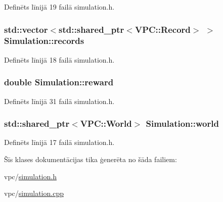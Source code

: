Definēts līnijā 19 failā simulation.\+h.

\subsubsection[{\texorpdfstring{records}{records}}]{\setlength{\rightskip}{0pt plus 5cm}std\+::vector$<$std\+::shared\+\_\+ptr$<${\bf V\+P\+C\+::\+Record}$>$ $>$ Simulation\+::records}\hypertarget{class_simulation_a8e55698283d8bbba9843391b0d9ecfa8}{}\label{class_simulation_a8e55698283d8bbba9843391b0d9ecfa8}


Definēts līnijā 18 failā simulation.\+h.

\subsubsection[{\texorpdfstring{reward}{reward}}]{\setlength{\rightskip}{0pt plus 5cm}double Simulation\+::reward}\hypertarget{class_simulation_a5224aea8e98ffc054c58674ab1494971}{}\label{class_simulation_a5224aea8e98ffc054c58674ab1494971}


Definēts līnijā 31 failā simulation.\+h.

\subsubsection[{\texorpdfstring{world}{world}}]{\setlength{\rightskip}{0pt plus 5cm}std\+::shared\+\_\+ptr$<${\bf V\+P\+C\+::\+World}$>$ Simulation\+::world}\hypertarget{class_simulation_ab8b3d4d3e13a05086f8497e5235fb37a}{}\label{class_simulation_ab8b3d4d3e13a05086f8497e5235fb37a}


Definēts līnijā 17 failā simulation.\+h.



Šīs klases dokumentācijas tika ģenerēta no šāda failiem\+:\begin{DoxyCompactItemize}
\item 
vpc/\hyperlink{simulation_8h}{simulation.\+h}\item 
vpc/\hyperlink{simulation_8cpp}{simulation.\+cpp}\end{DoxyCompactItemize}
